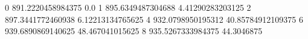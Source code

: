 0 891.2220458984375 0.0
1 895.6349487304688 4.41290283203125
2 897.3441772460938 6.12213134765625
4 932.0798950195312 40.85784912109375
6 939.6890869140625 48.467041015625
8 935.5267333984375 44.3046875
